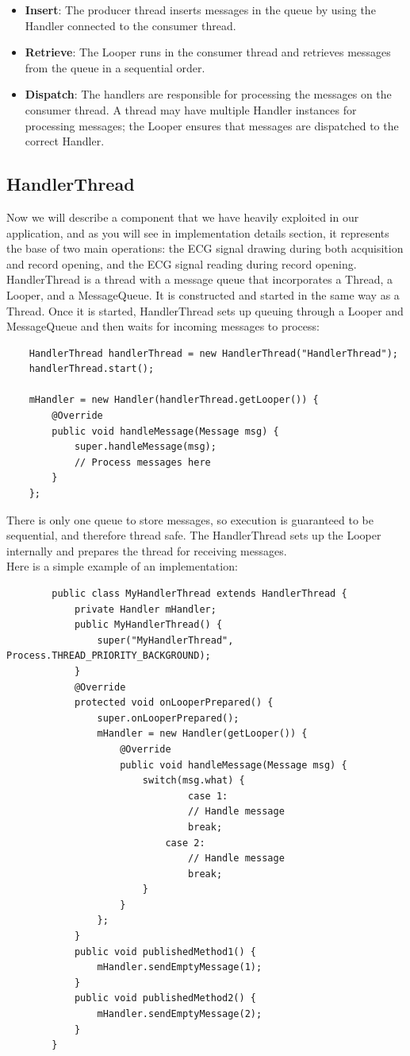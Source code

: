\begin{itemize}
	\item \textbf{Insert}: The producer thread inserts messages in the queue by using the Handler connected to the consumer thread.
	\item \textbf{Retrieve}: The Looper runs in the consumer thread and retrieves messages from the queue in a sequential order.
	\item \textbf{Dispatch}: The handlers are responsible for processing the messages on the consumer thread. A thread may have multiple Handler instances for processing messages; the Looper ensures that messages are dispatched to the correct Handler.
\end{itemize}

\subsection{HandlerThread}
Now we will describe a component that we have heavily exploited in our application, and as you will see in implementation details section, it represents the base of two main operations: the ECG signal drawing during both acquisition and record opening, and the ECG signal reading during record opening.\\
HandlerThread is a thread with a message queue that incorporates a Thread, a Looper, and a MessageQueue. It is constructed and started in the same way as a Thread. Once it is started, HandlerThread sets up queuing through a Looper and MessageQueue and then waits for incoming messages to process:
\begin{lstlisting}
	HandlerThread handlerThread = new HandlerThread("HandlerThread");
	handlerThread.start();
	
	mHandler = new Handler(handlerThread.getLooper()) {
		@Override
		public void handleMessage(Message msg) {
			super.handleMessage(msg);
			// Process messages here
		}
	};
\end{lstlisting}
There is only one queue to store messages, so execution is guaranteed to be sequential, and therefore thread safe. The HandlerThread sets up the Looper internally and prepares the thread for receiving messages.\\
Here is a simple example of an implementation:
\begin{lstlisting}
        public class MyHandlerThread extends HandlerThread {
	        private Handler mHandler;
	        public MyHandlerThread() {
		        super("MyHandlerThread", Process.THREAD_PRIORITY_BACKGROUND);
	        }
	        @Override
	        protected void onLooperPrepared() {
		        super.onLooperPrepared();
		        mHandler = new Handler(getLooper()) {
			        @Override
			        public void handleMessage(Message msg) {
				        switch(msg.what) {
								case 1:
						        // Handle message
						        break;
					        case 2:
						        // Handle message
						        break;
				        }
				    }
			    };
	        }
	        public void publishedMethod1() {
		        mHandler.sendEmptyMessage(1);
	        }
	        public void publishedMethod2() {
		        mHandler.sendEmptyMessage(2);
	        }
        }
\end{lstlisting}

